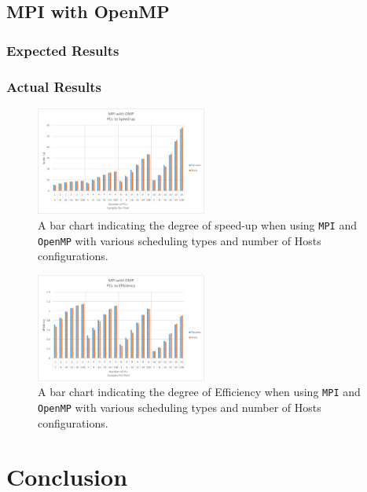 \documentclass[journal,transmag]{IEEEtran}
\begin{document}
	\subsection{MPI with OpenMP}
		\subsubsection{Expected Results}
		\subsubsection{Actual Results}
		
		\begin{figure}[h]
			\centering
			\includegraphics[width = 0.5\textwidth]{chartOMPISpeed}
			\caption{A bar chart indicating the degree of speed-up when using \texttt{MPI} and \texttt{OpenMP} with various scheduling types and number of Hosts configurations.}
			\label{fig_ompi_speed}
		\end{figure}
		
		\begin{figure}[h]
			\centering
			\includegraphics[width = 0.5\textwidth]{chartOMPIEff}
			\caption{A bar chart indicating the degree of Efficiency when using \texttt{MPI} and \texttt{OpenMP} with various scheduling types and number of Hosts configurations.}
			\label{fig_ompi_eff}
		\end{figure}

	
\section{Conclusion}
		



\end{document}
